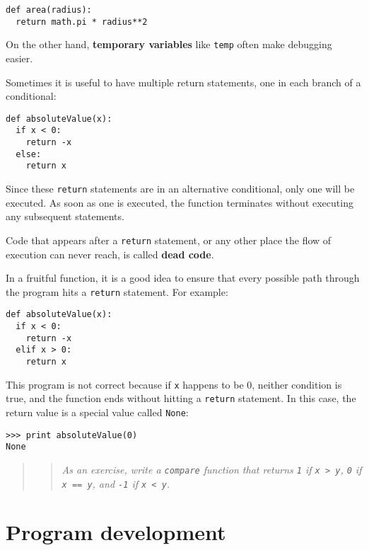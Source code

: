 \beforeverb
\begin{verbatim}
def area(radius):
  return math.pi * radius**2
\end{verbatim}
\afterverb
%
On the other hand, {\bf temporary variables} like {\tt temp} often make
debugging easier.


Sometimes it is useful to have multiple return statements, one in each
branch of a conditional:

\beforeverb
\begin{verbatim}
def absoluteValue(x):
  if x < 0:
    return -x
  else:
    return x
\end{verbatim}
\afterverb
%
Since these {\tt return} statements are in an alternative conditional,
only one will be executed.  As soon as one is executed, the function
terminates without executing any subsequent statements.

Code that appears after a {\tt return} statement, or any other place
the flow of execution can never reach, is called {\bf dead code}.


In a fruitful function, it is a good idea to ensure
that every possible path through the program hits a
{\tt return} statement.  For example:

\beforeverb
\begin{verbatim}
def absoluteValue(x):
  if x < 0:
    return -x
  elif x > 0:
    return x
\end{verbatim}
\afterverb
%
This program is not correct because if {\tt x} happens to be 0,
neither condition is true, and the function ends without hitting a
{\tt return} statement.
In this case, the return value is a special value called
{\tt None}:


\beforeverb
\begin{verbatim}
>>> print absoluteValue(0)
None
\end{verbatim}
\afterverb
%
\begin{quote}
\begin{quote}
{\em As an exercise, write a {\tt compare} function
that returns {\tt 1} if {\tt x > y},
{\tt 0} if {\tt x == y}, and {\tt -1} if {\tt x < y}.}
\end{quote}
\end{quote}


\section{Program development}
\label{program development}


